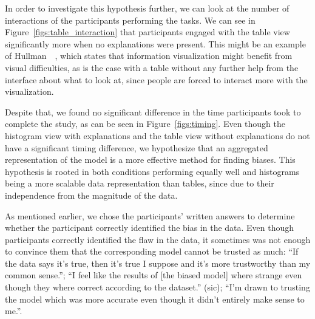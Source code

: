 In order to investigate this hypothesis further, we can look at the number of interactions of the participants performing the tasks.
We can see in Figure~\ref{figs:table_interaction} that participants engaged with the table view significantly more when no explanations were present.
This might be an example of Hullman~\etal~\cite{6064986}, which states that information visualization might benefit from visual difficulties, as is the case with a table without any further help from the interface about what to look at, since people are forced to interact more with the visualization.


Despite that, we found no significant difference in the time participants took to complete the study, as can be seen in Figure~\ref{figs:timing}.
Even though the histogram view with explanations and the table view without explanations do not have a significant timing difference, we hypothesize that an aggregated representation of the model is a more effective method for finding biases.
This hypothesis is rooted in both conditions performing equally well and histograms being a more scalable data representation than tables, since due to their independence from the magnitude of the data.

As mentioned earlier, we chose the participants' written answers to determine whether the participant correctly identified the bias in the data.
Even though participants correctly identified the flaw in the data, it sometimes was not enough to convince them that the corresponding model cannot be trusted as much:
``If the data says it's true, then it's true I suppose and it's more trustworthy than my common sense.'';
``I feel like the results of [the biased model] where strange even though they where correct according to the dataset.'' (sic);
``I'm drawn to trusting the model which was more accurate even though it didn't entirely make sense to me.''.

